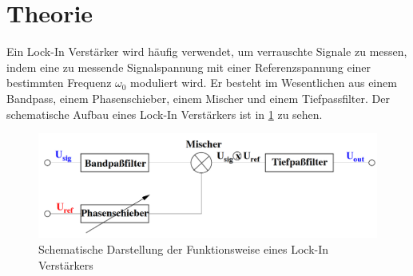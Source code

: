 \section{Theorie}
\label{sec:Theorie}

Ein Lock-In Verstärker wird häufig verwendet, um verrauschte Signale zu messen,
indem eine zu messende Signalspannung mit einer Referenzspannung einer bestimmten
Frequenz $\omega_0$ moduliert wird.
Er besteht im Wesentlichen aus einem Bandpass, einem Phasenschieber, einem Mischer
und einem Tiefpassfilter. Der schematische Aufbau eines Lock-In Verstärkers ist
in \ref{fig:schema} zu sehen.

\begin{figure}
  \centering
  \includegraphics[width=\textwidth]{data/schema.png}
  \caption{Schematische Darstellung der Funktionsweise eines Lock-In Verstärkers
  \cite{Versuchsanleitung}}
  \label{fig:schema}
\end{figure}


